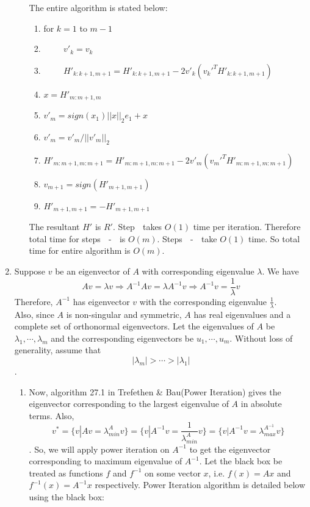 \documentclass{article}
\begin{document}
\begin{enumerate}
\begin{enumerate}[label=(\alph*)]
    The entire algorithm is stated below:
    \begin{enumerate}
        \item for $k = 1$ to $m - 1$
        \item $\qquad$ $v'_k = v_k$
        \item $\qquad$ $H'_{k : k + 1, m + 1} = H'_{k : k + 1,m + 1} - 2v'_k(v_k'^TH'_{k : k + 1, m + 1})$
        \item $x = H'_{m : m + 1, m}$
        \item $v'_m = sign(x_1)||x||_2e_1 + x$
        \item $v'_m = v'_m / ||v'_m||_2$
        \item $H'_{m : m + 1, m : m + 1} = H'_{m : m + 1, m : m + 1} - 2v'_m(v_m'^TH'_{m : m + 1, m : m + 1})$
        \item $v_{m + 1} = sign(H'_{m + 1, m + 1})$
        \item $H'_{m + 1, m + 1} = -H'_{m + 1, m + 1}$
    \end{enumerate}
    The resultant $H'$ is $R'$. Step  $\;$ takes $O(1)$ time per iteration. Therefore total time for steps  $\;$ -  $\;$ is $O(m)$. Steps  $\;$ -  $\;$ take $O(1)$ time. So total time for entire algorithm is $O(m)$.
    \end{enumerate}
    \clearpage
    \item Suppose $v$ be an eigenvector of $A$ with corresponding eigenvalue $\lambda$. We have
    $$Av = \lambda v \Rightarrow A^{-1}Av = \lambda A^{-1}v \Rightarrow A^{-1}v = \frac{1}{\lambda}v$$
    Therefore, $A^{-1}$ has eigenvector $v$ with the corresponding eigenvalue $\frac{1}{\lambda}$.\\
    Also, since $A$ is non-singular and symmetric, $A$ has real eigenvalues and a complete set of orthonormal eigenvectors. Let the eigenvalues of $A$ be $\lambda_1, \cdots, \lambda_m$ and the corresponding eigenvectors be $u_1, \cdots, u_m$. Without loss of generality, assume that
    $$|\lambda_m| > \cdots > |\lambda_1|$$.
    \begin{enumerate}[label=(\alph*)]
    \item Now, algorithm 27.1 in Trefethen \& Bau(Power Iteration) gives the eigenvector corresponding to the largest eigenvalue of $A$ in absolute terms. Also,
    $$v^* = \{v | Av = \lambda_{min}^A v\} = \{v | A^{-1}v = \frac{1}{\lambda_{min}^A}v\} = \{v | A^{-1}v = \lambda_{max}^{A^{-1}}v\}$$.
    So, we will apply power iteration on $A^{-1}$ to get the eigenvector corresponding to maximum eigenvalue of $A^{-1}$. Let the black box be treated as functions $f$ and $f^{-1}$ on some vector $x$, i.e. $f(x) = Ax$ and $f^{-1}(x) = A^{-1}x$ respectively. Power Iteration algorithm is detailed below using the black box:

\end{enumerate}
\end{enumerate}
\end{document}

